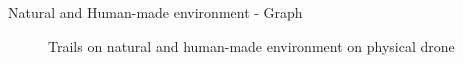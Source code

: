 \documentclass{beamer}
\begin{document}
\begin{frame}{Natural and Human-made environment - Graph }
	\begin{figure}
		\caption{Trails on natural and human-made environment on physical drone}
	\end{figure}
\end{frame}
\end{document}

